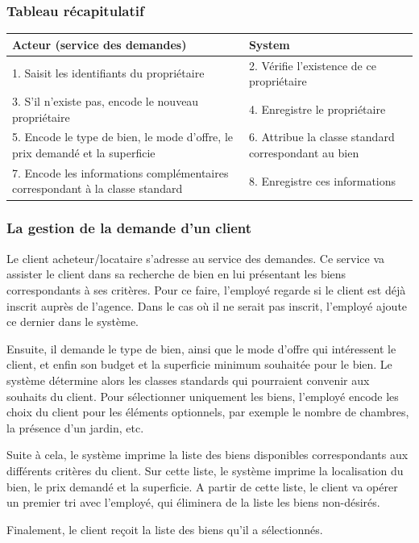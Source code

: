 \subsubsection*{Tableau récapitulatif}
\begin{longtable}{|p{7.5cm}|p{7.5cm}|}
\hline
Acteur (service des demandes)& System\\
\hline
1. Saisit les identifiants du propriétaire & 2. Vérifie l'existence de ce propriétaire\\
3. S'il n'existe pas, encode le nouveau propriétaire & 4. Enregistre le propriétaire\\
5. Encode le type de bien, le mode d'offre, le prix demandé et la superficie & 6. Attribue la classe standard correspondant au bien\\
7. Encode les informations complémentaires correspondant à la classe standard & 8. Enregistre ces informations\\	
\hline
\end{longtable}
\subsubsection{La gestion de la demande d'un client}
Le client acheteur/locataire s'adresse au service des demandes.
Ce service va assister le client dans sa recherche de bien en lui présentant les biens correspondants à ses critères.
Pour ce faire, l'employé regarde si le client est déjà inscrit auprès de l'agence. Dans le cas où il ne serait pas inscrit, l'employé ajoute ce dernier dans le système.

Ensuite, il demande le type de bien, ainsi que le mode d'offre qui intéressent le client, et enfin son budget et la superficie minimum souhaitée pour le bien. Le système détermine alors les classes standards qui pourraient convenir aux souhaits du client.
Pour sélectionner uniquement les biens, l'employé encode les choix du client pour les éléments optionnels, par exemple le nombre de chambres, la présence d'un jardin, etc.

Suite à cela, le système imprime la liste des biens disponibles correspondants aux différents critères du client.
Sur cette liste, le système imprime  la localisation du bien, le prix demandé et la superficie.
A partir de cette liste, le client va opérer un premier tri avec l'employé, qui éliminera de la liste les biens non-désirés.

Finalement, le client reçoit la liste des biens qu'il a sélectionnés.

